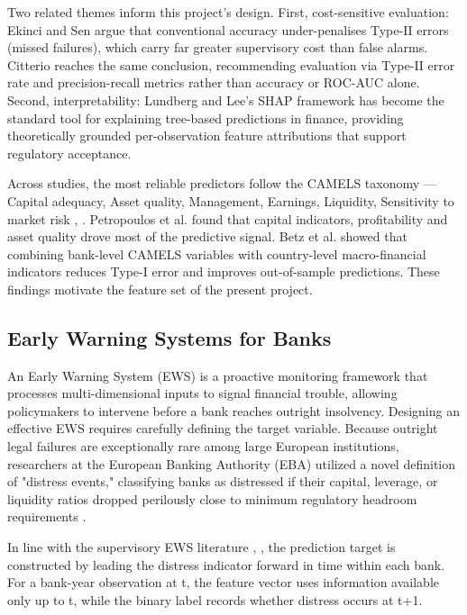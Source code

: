 \documentclass[conference]{IEEEtran}
\begin{document}
Two related themes inform this project's design. First, cost-sensitive evaluation: Ekinci and Sen \cite{b10} argue that conventional accuracy under-penalises Type-II errors (missed failures), which carry far greater supervisory cost than false alarms. Citterio \cite{b1} reaches the same conclusion, recommending evaluation via Type-II error rate and precision-recall metrics rather than accuracy or ROC-AUC alone. Second, interpretability: Lundberg and Lee's SHAP framework \cite{b11} has become the standard tool for explaining tree-based predictions in finance, providing theoretically grounded per-observation feature attributions that support regulatory acceptance.

Across studies, the most reliable predictors follow the CAMELS taxonomy — Capital adequacy, Asset quality, Management, Earnings, Liquidity, Sensitivity to market risk \cite{b4}, \cite{b12}. Petropoulos et al. \cite{b4} found that capital indicators, profitability and asset quality drove most of the predictive signal. Betz et al. \cite{b2} showed that combining bank-level CAMELS variables with country-level macro-financial indicators reduces Type-I error and improves out-of-sample predictions. These findings motivate the feature set of the present project.

\subsection{Early Warning Systems for Banks}

An Early Warning System (EWS) is a proactive monitoring framework that processes multi-dimensional inputs to signal financial trouble, allowing policymakers to intervene before a bank reaches outright insolvency. Designing an effective EWS requires carefully defining the target variable. Because outright legal failures are exceptionally rare among large European institutions, researchers at the European Banking Authority (EBA) utilized a novel definition of "distress events," classifying banks as distressed if their capital, leverage, or liquidity ratios dropped perilously close to minimum regulatory headroom requirements \cite{b3}. 

In line with the supervisory EWS literature \cite{b2}, \cite{b4}, the prediction target is constructed by leading the distress indicator forward in time within each bank. For a bank-year observation at t, the feature vector uses information available only up to t, while the binary label records whether distress occurs at t+1.
\end{document}
